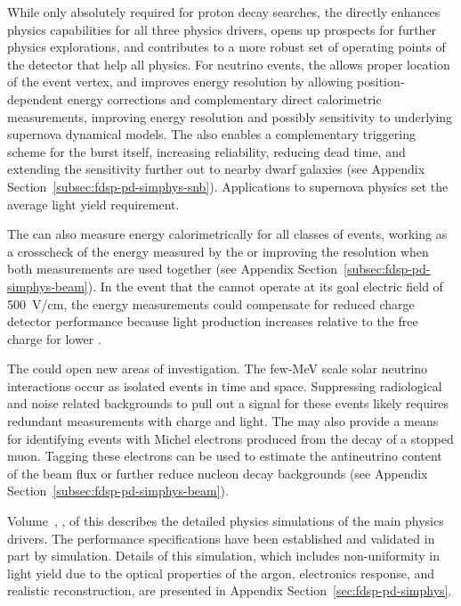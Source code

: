 While only absolutely required for proton decay searches, the  directly enhances physics capabilities for all three  physics drivers, opens up prospects for further physics explorations, and contributes to a more robust set of operating points of the detector that help all physics.   For  neutrino events, the  allows proper location of the event vertex, and improves energy resolution by allowing position-dependent energy corrections and complementary direct calorimetric measurements, 
improving energy resolution and possibly sensitivity to underlying supernova dynamical models.  The  also enables a complementary triggering scheme for the burst itself, increasing 
reliability, reducing dead time, and extending the sensitivity further out to nearby dwarf galaxies (see Appendix Section~\ref{subsec:fdsp-pd-simphys-snb}). Applications to supernova physics set the average light yield requirement. %


The  can also measure energy calorimetrically for all classes of events, working as a crosscheck of the energy measured by the  or improving the resolution when both measurements are used together (see Appendix Section~\ref{subsec:fdsp-pd-simphys-beam}).  In the event that the   cannot operate at its goal electric field of \SI{500}{V/cm}, the  energy measurements could compensate for reduced charge detector performance because light production increases relative to the free charge for lower \efield{}.

The  could open new areas of investigation.  The few-MeV scale solar neutrino interactions occur as isolated events in time and space.  Suppressing radiological and noise related backgrounds to pull out a signal for these events likely requires redundant measurements with charge and light.  The  may also provide a means for identifying events with Michel electrons produced from the decay of a stopped muon. Tagging these electrons can be used to estimate the antineutrino content of the beam flux or further reduce nucleon decay backgrounds (see Appendix Section~\ref{subsec:fdsp-pd-simphys-beam}).
 

Volume~\volnumberphysics{}, \voltitlephysics{},  of this  describes the detailed physics simulations of the main  physics drivers.  
The  performance specifications have been established and validated in part by simulation.  Details of this simulation, which includes non-uniformity in light yield due to the optical properties of the argon, electronics response, and realistic reconstruction, are presented in Appendix Section~\ref{sec:fdsp-pd-simphys}.


